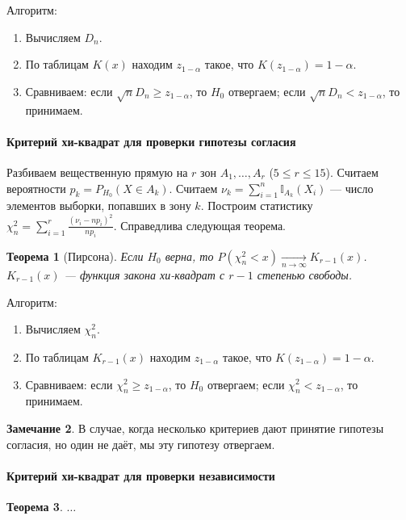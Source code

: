 \documentclass[11pt,openany,a4paper]{scrartcl}
\theoremstyle{plain}
\newtheorem{theorem}{Теорема}[subsection]
\theoremstyle{definition}
\newtheorem{remark}[theorem]{Замечание}
\newcommand\mb{\mathbb}
\newcommand{\underto}[1]{\xrightarrow[#1]{}}
\begin{document}
Алгоритм:
\begin{enumerate}
    \item Вычисляем $D_n$.
    \item По таблицам $K(x)$ находим $z_{1-\alpha}$ такое, что $K(z_{1-\alpha}) = 1 - \alpha$.
    \item Сравниваем: если $\sqrt n D_n \geqslant z_{1-\alpha}$, то $H_0$ отвергаем; если
    $\sqrt n D_n < z_{1-\alpha}$, то принимаем.
\end{enumerate}

\paragraph{Критерий хи-квадрат для проверки гипотезы согласия}
Разбиваем вещественную прямую на $r$ зон $A_1, \ldots, A_r$ ($5 \leqslant r \leqslant 15$).
Считаем вероятности $p_k = P_{H_0}(X \in A_k)$.
Считаем $\nu_k = \sum\limits_{i=1}^n \mb I_{A_k} (X_i)$ — число элементов
выборки, попавших в зону $k$.
Построим статистику $\chi_n^2 = \sum\limits_{i=1}^r \frac{(\nu_i - np_i)^2}{np_i}$. Справедлива
следующая теорема.
\begin{theorem}[Пирсона]
    Если $H_0$ верна, то $P(\chi_n^2 < x) \underto{n \to \infty} K_{r-1}(x)$. $K_{r-1}(x)$ —
    функция закона хи-квадрат с $r-1$ степенью свободы.
\end{theorem}

Алгоритм:
\begin{enumerate}
    \item Вычисляем $\chi_n^2$.
    \item По таблицам $K_{r-1}(x)$ находим $z_{1-\alpha}$ такое,
    что $K(z_{1-\alpha}) = 1 - \alpha$.
    \item Сравниваем: если $\chi_n^2 \geqslant z_{1-\alpha}$, то $H_0$ отвергаем; если
    $\chi_n^2 < z_{1-\alpha}$, то принимаем.
\end{enumerate}

\begin{remark}
    В случае, когда несколько критериев дают принятие гипотезы согласия, но один не даёт,
    мы эту гипотезу отвергаем.
\end{remark}

\paragraph{Критерий хи-квадрат для проверки независимости}

\begin{theorem}
    $\ldots$
\end{theorem}
\end{document}

